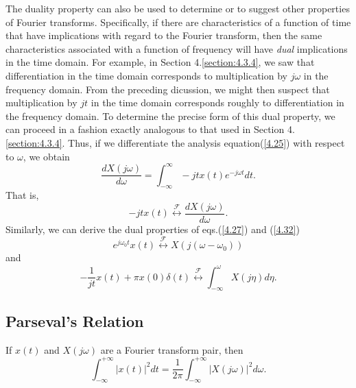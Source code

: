 \documentclass[a4paper,twoside]{book}
\begin{document}
The duality property can also be used to determine or to suggest other properties of Fourier transforms. Specifically, if there are characteristics of a function of time that have implications with regard to the Fourier transform, then the same characteristics associated with a function of frequency will have \textit{dual} implications in the time domain. For example, in Section 4.\ref{section:4.3.4}, we saw that differentiation in the time domain corresponds to multiplication by $j\omega$ in the frequency domain. From the preceding dicussion, we might then suspect that multiplication by $jt$ in the time domain corresponds roughly to differentiation in the frequency domain. To determine the precise form of this dual property, we can proceed in a fashion exactly analogous to that used in Section 4.\ref{section:4.3.4}. Thus, if we differentiate the analysis equation\;(\ref{4.25}) with respect to $\omega$, we obtain
\begin{equation}
    \dfrac{dX(j\omega)}{d\omega}=\int_{-\infty}^{\infty}-jtx(t)e^{-j\omega t}dt.
    \label{4.39}
\end{equation}
That is,
\begin{equation}
    \boxed{-jtx(t)\overset{\mathcal{F}}{\longleftrightarrow}\dfrac{dX(j\omega)}{d\omega}.}
    \label{4.40}
\end{equation}
Similarly, we can derive the dual properties of eqs.\;(\ref{4.27}) and (\ref{4.32})
\begin{equation}
    \boxed{e^{j\omega_0 t}x(t)\overset{\mathcal{F}}{\longleftrightarrow}X(j(\omega-\omega_0))}
    \label{4.41}
\end{equation}
and
\begin{equation}
    \boxed{-\dfrac1{jt}x(t)+\pi x(0)\delta(t)\overset{\mathcal{F}}{\longleftrightarrow}\int_{-\infty}^\omega X(j\eta)d\eta.}
    \label{4.42}
\end{equation}

\subsection{Parseval's Relation}

If $x(t)$ and $X(j\omega)$ are a Fourier transform pair, then
\begin{equation}
    \boxed{\int_{-\infty}^{+\infty}|x(t)|^2dt=\frac1{2\pi}\int_{-\infty}^{+\infty}|X(j\omega)|^2d\omega.}
    \label{4.43}
\end{equation}
\end{document}
